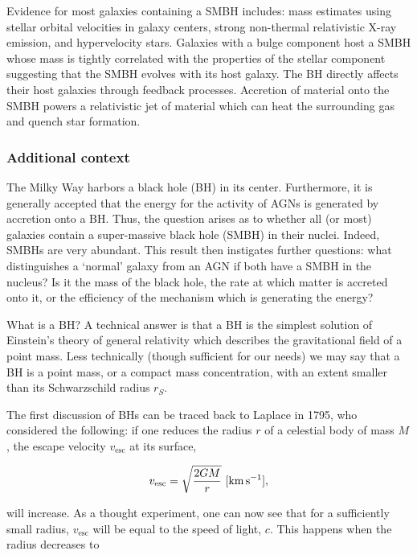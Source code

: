 \documentclass[a4paper,11pt]{article}
\begin{document}
Evidence for most galaxies containing a SMBH includes: mass estimates using stellar orbital velocities in galaxy centers, strong non-thermal relativistic X-ray emission, and hypervelocity stars. Galaxies with a bulge component host a SMBH whose mass is tightly correlated with the properties of the stellar component suggesting that the SMBH evolves with its host galaxy. The BH directly affects their host galaxies through feedback processes. Accretion of material onto the SMBH powers a relativistic jet of material which can heat the surrounding gas and quench star formation. 

\subsubsection{Additional context}

The Milky Way harbors a black hole (BH) in its center. Furthermore, it is generally accepted that the energy for the activity of AGNs is generated by accretion onto a BH. Thus, the question arises as to whether all (or most) galaxies contain a super-massive black hole (SMBH) in their nuclei. Indeed, SMBHs are very abundant. This result then instigates further questions: what distinguishes a `normal' galaxy from an AGN if both have a SMBH in the nucleus? Is it the mass of the black hole, the rate at which matter is accreted onto it, or the efficiency of the mechanism which is generating the energy?

{\noindent}What is a BH? A technical answer is that a BH is the simplest solution of Einstein’s theory of general relativity which describes the gravitational field of a point mass. Less technically (though sufficient for our needs) we may say that a BH is a point mass, or a compact mass concentration, with an extent smaller than its Schwarzschild radius $r_S$.

{\noindent}The first discussion of BHs can be traced back to Laplace in 1795, who considered the following: if one reduces the radius $r$ of a celestial body of mass $M$, the escape velocity $v_\mathrm{esc}$ at its surface,

\begin{align*}
    v_\mathrm{esc} = \sqrt{\frac{2GM}{r}} ~ [{\rm km\,s^{-1}}],
\end{align*}

{\noindent}will increase. As a thought experiment, one can now see that for a sufficiently small radius, $v_\mathrm{esc}$ will be equal to the speed of light, $c$. This happens when the radius decreases to
\end{document}
